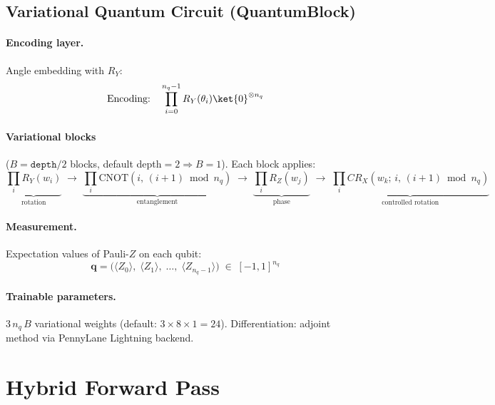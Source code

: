 \documentclass[11pt,a4paper]{article}
\begin{document}
\subsection{Variational Quantum Circuit (QuantumBlock)}

\paragraph{Encoding layer.} Angle embedding with $R_Y$:
\begin{equation}
\text{Encoding:}\quad \prod_{i=0}^{n_q-1} R_Y(\theta_i)\ket{0}^{\otimes n_q}
\end{equation}

\paragraph{Variational blocks} ($B = \texttt{depth}/2$ blocks, default depth$=2 \Rightarrow B=1$).
Each block applies:
\begin{equation}
\underbrace{\prod_{i} R_Y(w_i)}_{\text{rotation}}
\;\to\;
\underbrace{\prod_{i} \text{CNOT}(i,\,(i{+}1)\bmod n_q)}_{\text{entanglement}}
\;\to\;
\underbrace{\prod_{i} R_Z(w_j)}_{\text{phase}}
\;\to\;
\underbrace{\prod_{i} CR_X(w_k;\,i,\,(i{+}1)\bmod n_q)}_{\text{controlled rotation}}
\end{equation}

\paragraph{Measurement.} Expectation values of Pauli-$Z$ on each qubit:
\begin{equation}
\mathbf{q} = \bigl(\langle Z_0\rangle,\;\langle Z_1\rangle,\;\ldots,\;\langle Z_{n_q-1}\rangle\bigr) \;\in\; [-1,1]^{n_q}
\end{equation}

\paragraph{Trainable parameters.} $3\,n_q\,B$ variational weights (default: $3\times 8\times 1 = 24$).
Differentiation: adjoint method via PennyLane Lightning backend.

\section{Hybrid Forward Pass}
\end{document}
